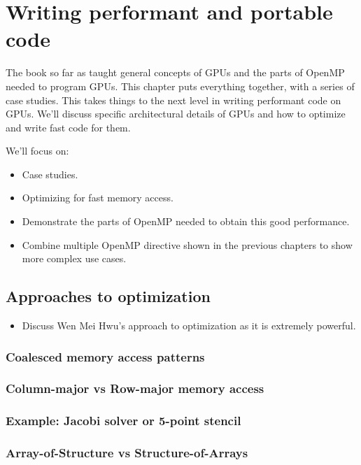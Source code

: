 

\chapter{Writing performant and portable code}
\label{chapter:portable}

The book so far as taught general concepts of GPUs and the parts of OpenMP needed to program GPUs.
This chapter puts everything together, with a series of case studies.
This takes things to the next level in writing performant code on GPUs.
We'll discuss specific architectural details of GPUs and how to optimize and write fast code for them.

We'll focus on:
\begin{itemize}
  \item Case studies.
  \item Optimizing for fast memory access.
  \item Demonstrate the parts of OpenMP needed to obtain this good performance.
  \item Combine multiple OpenMP directive shown in the previous chapters to show more complex use cases.
\end{itemize}

\section{Approaches to optimization}
\begin{itemize}
  \item Discuss Wen Mei Hwu's approach to optimization as it is extremely powerful.
\end{itemize}

\subsection{Coalesced memory access patterns}
\subsection{Column-major vs Row-major memory access}
\subsection{Example: Jacobi solver or 5-point stencil}

\subsection{Array-of-Structure vs Structure-of-Arrays}
